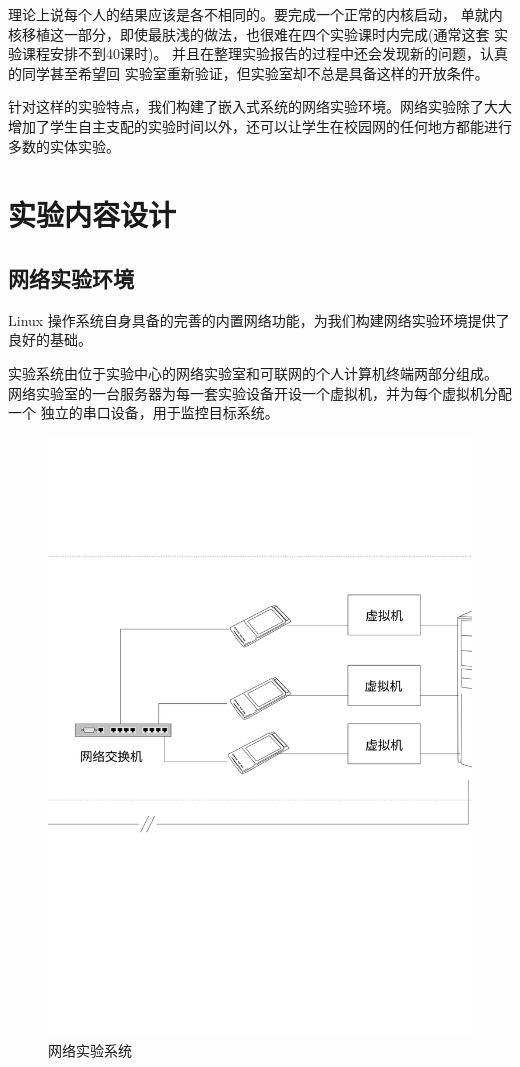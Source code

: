 \documentclass[nofonts]{ctexart}
\begin{document}
理论上说每个人的结果应该是各不相同的。要完成一个正常的内核启动，
单就内核移植这一部分，即使最肤浅的做法，也很难在四个实验课时内完成(通常这套
实验课程安排不到40课时)。
并且在整理实验报告的过程中还会发现新的问题，认真的同学甚至希望回
实验室重新验证，但实验室却不总是具备这样的开放条件。

    针对这样的实验特点，我们构建了嵌入式系统的网络实验环境。网络实验除了大大
增加了学生自主支配的实验时间以外，还可以让学生在校园网的任何地方都能进行
多数的实体实验。

\section{实验内容设计}
\subsection{网络实验环境}
    Linux 操作系统自身具备的完善的内置网络功能，为我们构建网络实验环境提供了
良好的基础。

    实验系统由位于实验中心的网络实验室和可联网的个人计算机终端两部分组成。
网络实验室的一台服务器为每一套实验设备开设一个虚拟机，并为每个虚拟机分配一个
独立的串口设备，用于监控目标系统。

\begin{figure}[!h]
\centering
\includegraphics[width=.8\textwidth]{server}
\caption{网络实验系统}\label{fig4}
\end{figure}
\end{document}
